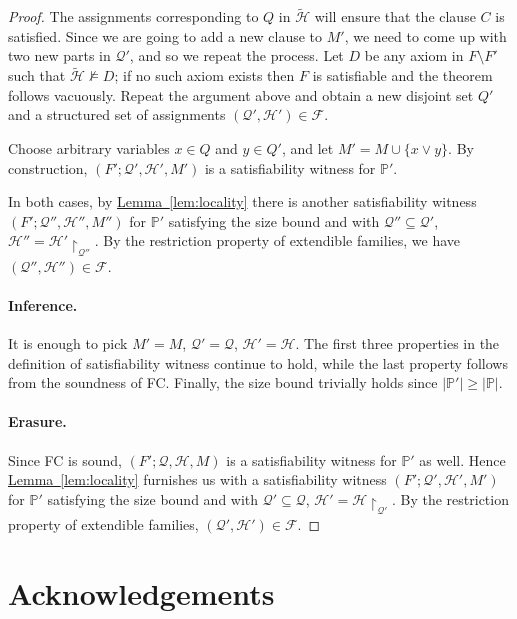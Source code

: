 \documentclass[11pt]{article}
\numberwithin{equation}{section}
\theoremstyle{definition}
\theoremstyle{plain}
\newcommand{\expref}[2]{\hyperref[#2]{#1~\ref{#2}}}
\theoremstyle{plain}
\theoremstyle{definition}
\newcommand{\reflem}[1]{\expref{Lemma}{#1}}
\newcommand{\set}[1]{\{ #1 \}}
\newcommand{\setsize}[1]{\lvert#1\rvert}
\newcommand{\union}{\cup}
\newcommand{\polynomialsetformat}[1]{\mathbb{#1}}
\newcommand{\pcsp}{\polynomialsetformat{P}}
\newcommand{\restrict}[2]{{{#1}\!\!\upharpoonright_{#2}}}
\newcommand{\satwitness}[1][]{(F';\partitionnot #1, \assignmentsetnot #1, M #1)}
\newcommand{\kextendibleNok}{extendible\xspace}
\newcommand{\partitionnot}{\mathcal{Q}}
\newcommand{\assignmentsetnot}{\mathcal{H}}
\newcommand{\structuredassignmentsnot}[1][]{(\partitionnot #1,\assignmentsetnot #1)}
\newcommand{\kextendfamily}{\ensuremath{\mathcal{F}}\xspace}
\newcommand{\restrictionproperty}{restriction property\xspace}
\begin{document}
\begin{proof}
The assignments corresponding to $Q$ in $\tilde{\assignmentsetnot}$ will ensure that the clause $C$ is satisfied. Since we are going to add a new clause to $M'$, we need to come up with two new parts in $\partitionnot'$, and so we repeat the process. Let $D$ be any axiom in $F\setminus F'$ such that $\tilde{\assignmentsetnot}\not\models D$; if no such axiom exists then $F$ is satisfiable and the theorem follows vacuously. Repeat the argument above and obtain a new disjoint set $Q'$ and a structured set of assignments $\structuredassignmentsnot['] \in \kextendfamily$.

Choose arbitrary variables $x \in Q$ and $y \in Q'$, and let $M'=M\union\set{x\lor y}$. By construction, $\satwitness[']$ is a satisfiability witness for $\pcsp'$.

In both cases, by \reflem{lem:locality} there is another satisfiability witness $\satwitness['']$ for $\pcsp'$ satisfying the size bound and with $\partitionnot''\subseteq\partitionnot'$, $\assignmentsetnot''=\restrict{\assignmentsetnot'}{\partitionnot''}$. By the \restrictionproperty of \kextendibleNok families, we have $\structuredassignmentsnot[''] \in \kextendfamily$.

%
\paragraph{Inference.} It is enough to pick $M'=M$, $\partitionnot'=\partitionnot$, $\assignmentsetnot'=\assignmentsetnot$. The first three properties in the definition of satisfiability witness continue to hold, while the last property follows from the soundness of FC\@. Finally, the size bound trivially holds since $\setsize{\pcsp'} \geq \setsize{\pcsp}$.

%
\paragraph{Erasure.} Since FC is sound, $\satwitness$ is a satisfiability witness for $\pcsp'$ as well. Hence \reflem{lem:locality} furnishes us with a satisfiability witness $\satwitness[']$ for $\pcsp'$ satisfying the size bound and with $\partitionnot'\subseteq\partitionnot$, $\assignmentsetnot'=\restrict{\assignmentsetnot}{\partitionnot'}$. By the \restrictionproperty of \kextendibleNok families, $\structuredassignmentsnot['] \in \kextendfamily$.
\end{proof}

\section*{Acknowledgements}
\end{document}
